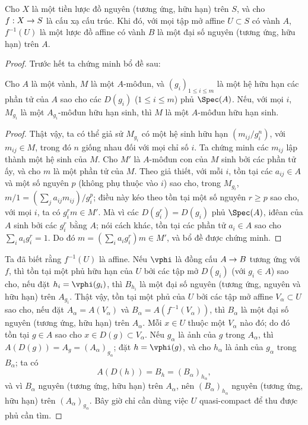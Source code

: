 \documentclass[oneside,10pt]{amsart}
\makeatletter
\renewcommand{\leq}{\leqslant}
\renewcommand{\geq}{\geqslant}
\newcommand{\ega@arrow}[2]{\mathchoice{#1}{#2}{#2}{#2}}
\renewcommand{\to}{\ega@arrow{\longrightarrow}{\rightarrow}}
\newcommand{\oldpage}[2][]{\marginnote{\normalfont\footnotesize\textbf{#1}~|~#2}\ignorespaces}
\let\EGAOriginalLabel\label
\renewcommand{\label}[1]{\phantomsection\EGAOriginalLabel{#1}}
\makeatother
\begin{document}
\begin{proposition}[6.1.4]
\label{II.6.1.4}
Cho $X$ là một tiền lược đồ nguyên (tương ứng, hữu hạn) trên $S$, và cho $f:X\to S$ là cấu xạ cấu trúc.
Khi đó, với mọi tập mở affine $U\subset S$ có vành $A$, $f^{-1}(U)$ là một lược đồ affine có vành $B$ là một đại số nguyên (tương ứng, hữu hạn) trên $A$.
\end{proposition}
\oldpage[II]{111}
\begin{proof}
Trước hết ta chứng minh bổ đề sau:

  \begin{lemma}[6.1.4.1]
  \label{II.6.1.4.1}
  Cho $A$ là một vành, $M$ là một $A$-môđun, và $(g_i)_{1\leq i\leq m}$ là một hệ hữu hạn các phần tử của $A$ sao cho các $D(g_i)$ ($1\leq i\leq m$) phủ $\Spec(A)$.
  Nếu, với mọi $i$, $M_{g_i}$ là một $A_{g_i}$-môđun hữu hạn sinh, thì $M$ là một $A$-môđun hữu hạn sinh.
  \end{lemma}

  \begin{proof}
  Thật vậy, ta có thể giả sử $M_{g_i}$ có một hệ sinh hữu hạn $(m_{ij}/g_i^n)$, với $m_{ij}\in M$, trong đó $n$ giống nhau đối với mọi chỉ số $i$.
  Ta chứng minh các $m_{ij}$ lập thành một hệ sinh của $M$.
  Cho $M'$ là $A$-môđun con của $M$ sinh bởi các phần tử ấy, và cho $m$ là một phần tử của $M$.
  Theo giả thiết, với mỗi $i$, tồn tại các $a_{ij}\in A$ và một số nguyên $p$ (không phụ thuộc vào $i$) sao cho, trong $M_{g_i}$, $m/1=(\sum_j a_{ij}m_{ij})/g_i^p$;
  điều này kéo theo tồn tại một số nguyên $r\geq p$ sao cho, với mọi $i$, ta có $g_i^rm\in M'$.
  Mà vì các $D(g_i^r)=D(g_i)$ phủ $\Spec(A)$, iđêan của $A$ sinh bởi các $g_i^r$ bằng $A$; nói cách khác, tồn tại các phần tử $a_i\in A$ sao cho $\sum_i a_ig_i^r=1$.
  Do đó $m=(\sum_i a_i g_i^r)m\in M'$, và bổ đề được chứng minh.
  \end{proof}

Ta đã biết  rằng $f^{-1}(U)$ là affine.
Nếu $\vphi$ là đồng cấu $A\to B$ tương ứng với $f$, thì tồn tại một phủ hữu hạn của $U$ bởi các tập mở $D(g_i)$ (với $g_i\in A$) sao cho, nếu đặt $h_i=\vphi(g_i)$, thì $B_{h_i}$ là một đại số nguyên (tương ứng, nguyên và hữu hạn) trên $A_{g_i}$.
Thật vậy, tồn tại một phủ của $U$ bởi các tập mở affine $V_\alpha\subset U$ sao cho, nếu đặt $A_\alpha=A(V_\alpha)$ và $B_\alpha=A(f^{-1}(V_\alpha))$, thì $B_\alpha$ là một đại số nguyên (tương ứng, hữu hạn) trên $A_\alpha$.
Mỗi $x\in U$ thuộc một $V_\alpha$ nào đó; do đó tồn tại $g\in A$ sao cho $x\in D(g)\subset V_\alpha$.
Nếu $g_\alpha$ là ảnh của $g$ trong $A_\alpha$, thì $A(D(g))=A_g=(A_\alpha)_{g_\alpha}$;
đặt $h=\vphi(g)$, và cho $h_\alpha$ là ảnh của $g_\alpha$ trong $B_\alpha$;
ta có
\[
  A(D(h))=B_h=(B_\alpha)_{h_\alpha},
\]
và vì $B_\alpha$ nguyên (tương ứng, hữu hạn) trên $A_\alpha$, nên $(B_\alpha)_{h_\alpha}$ nguyên (tương ứng, hữu hạn) trên $(A_\alpha)_{g_\alpha}$.
Bây giờ chỉ cần dùng việc $U$ quasi-compact để thu được phủ cần tìm.


\end{proof}
\end{document}
